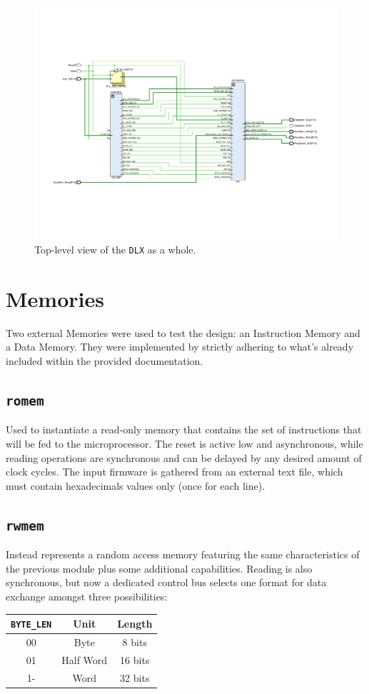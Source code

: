 \begin{figure}[!ht]
\centering
\includegraphics[width=\textwidth]{./chapters/figures/DLX.pdf} 
\caption{Top-level view of the \texttt{DLX} as a whole.}
\end{figure}

\section{Memories}
Two external Memories were used to test the design: an Instruction Memory and a Data Memory. They were implemented by strictly adhering to what's already included within the provided documentation.

\subsection{\texttt{romem}}
Used to instantiate a read-only memory that contains the set of instructions that will be fed to the microprocessor. The reset is active low and asynchronous, while reading operations are synchronous and can be delayed by any desired amount of clock cycles. The input firmware is gathered from an external text file, which must contain hexadecimals values only (once for each line).

\subsection{\texttt{rwmem}}
Instead represents a random access memory featuring the same characteristics of the previous module plus some additional capabilities. Reading is also synchronous, but now a dedicated control bus selects one format for data exchange amongst three possibilities:
\begin{table}[!ht]
\centering
\begin{tabular}{c|cc}
\toprule
\texttt{BYTE\_LEN} & Unit & Length\\
\midrule
00 & Byte & 8 bits\\
01 & Half Word & 16 bits\\
1- & Word & 32 bits\\
\bottomrule
\end{tabular}
\end{table}

